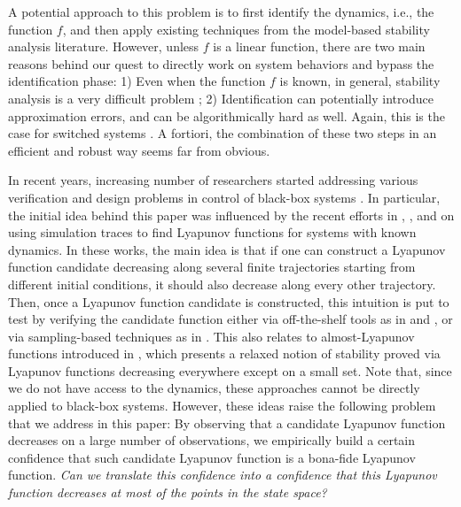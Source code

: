 A potential approach to this problem is to first identify the dynamics, i.e., the function $f$, and then apply existing techniques from the model-based stability analysis literature. However, unless $f$ is a linear function, there are two main reasons behind our quest to directly work on system behaviors and bypass the identification phase: 1) Even when the function $f$ is known, in general, stability analysis is a very difficult problem \cite{stabilityHard1}; 2) Identification can potentially introduce approximation errors, and can be algorithmically hard as well. Again, this is the case for switched systems \cite{lauer}. A fortiori, the combination of these two steps in an efficient and robust way seems far from obvious.

In recent years, increasing number of researchers started addressing various verification and design problems in control of black-box systems \cite{bianchini, balkan, mitra, mitra2}. In particular, the initial idea behind this paper was influenced by the recent efforts in \cite{topcu}, \cite{kapinski}, and \cite{lazar} on using simulation traces to find Lyapunov functions for systems with known dynamics. In these works, the main idea is that if one can construct a Lyapunov function candidate decreasing along several finite trajectories starting from different initial conditions, it should also decrease along every other trajectory. Then, once a Lyapunov function candidate is constructed, this intuition is put to test by verifying the candidate function either via off-the-shelf tools as in \cite{topcu} and \cite{kapinski}, or via sampling-based techniques as in \cite{lazar}. This also relates to almost-Lyapunov functions introduced in \cite{liberzon}, which presents a relaxed notion of stability proved via Lyapunov functions decreasing everywhere except on a small set. Note that, since we do not have access to the dynamics, these approaches cannot be directly applied to black-box systems. However, these ideas raise the following problem that we address in this paper: By observing that a candidate Lyapunov function decreases on a large number of observations, we empirically build a certain confidence that such candidate Lyapunov function is a bona-fide Lyapunov function. \emph{Can we translate this confidence into a confidence that this Lyapunov function decreases at most of the points in the state space?} 

